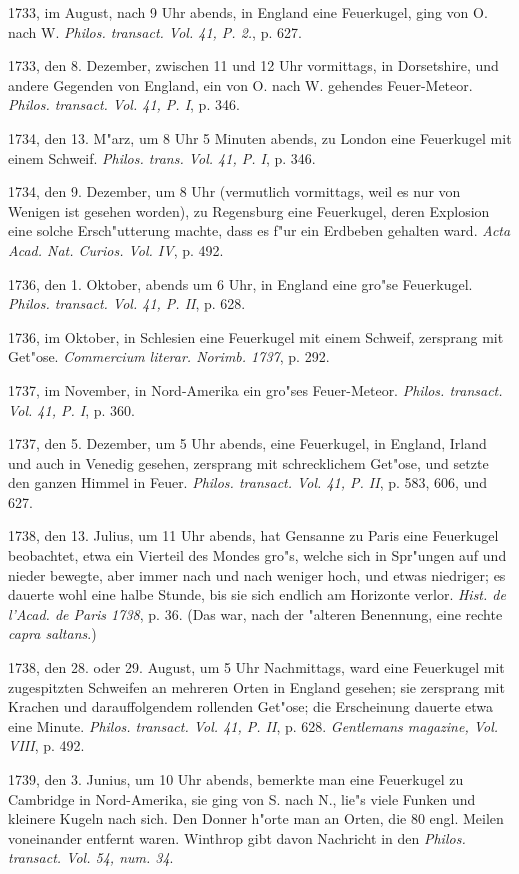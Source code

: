 \documentclass[a4paper, 11pt, oneside, polutonikogreek, german]{article}
\begin{document}
1733, im August, nach 9 Uhr abends, in England eine Feuerkugel, ging von O. nach W. \emph{Philos. transact. Vol. 41, P. 2.}, p. 627.

1733, den 8. Dezember, zwischen 11 und 12 Uhr vormittags, in Dorsetshire, und andere Gegenden von England, ein von O. nach W. gehendes Feuer-Meteor. \emph{Philos. transact. Vol. 41, P. I}, p. 346.

1734, den 13. M"arz, um 8 Uhr 5 Minuten abends, zu London eine Feuerkugel mit einem Schweif. \emph{Philos. trans. Vol. 41, P. I}, p. 346.

1734, den 9. Dezember, um 8 Uhr (vermutlich vormittags, weil es nur von Wenigen ist gesehen worden), zu Regensburg eine Feuerkugel, deren Explosion eine solche Ersch"utterung machte, dass es f"ur ein Erdbeben gehalten ward. \emph{Acta Acad. Nat. Curios. Vol. IV}, p. 492.

1736, den 1. Oktober, abends um 6 Uhr, in England eine gro"se Feuerkugel. \emph{Philos. transact. Vol. 41, P. II}, p. 628.

1736, im Oktober, in Schlesien eine Feuerkugel mit einem Schweif, zersprang mit Get"ose. \emph{Commercium literar. Norimb. 1737}, p. 292.

1737, im November, in Nord-Amerika ein gro"ses Feuer-Meteor. \emph{Philos. transact. Vol. 41, P. I}, p. 360.

1737, den 5. Dezember, um 5 Uhr abends, eine Feuerkugel, in England, Irland und auch in Venedig gesehen, zersprang mit schrecklichem Get"ose, und setzte den ganzen Himmel in Feuer. \emph{Philos. transact. Vol. 41, P. II}, p. 583, 606, und 627.

1738, den 13. Julius, um 11 Uhr abends, hat Gensanne zu Paris eine Feuerkugel beobachtet, etwa ein Vierteil des Mondes gro"s, welche sich in Spr"ungen auf und nieder bewegte, aber immer nach und nach weniger hoch, und etwas niedriger; es dauerte wohl eine halbe Stunde, bis sie sich endlich am Horizonte verlor. \emph{Hist. de l'Acad. de Paris 1738}, p. 36. (Das war, nach der "alteren Benennung, eine rechte \emph{capra saltans}.)

1738, den 28. oder 29. August, um 5 Uhr Nachmittags, ward eine Feuerkugel mit zugespitzten Schweifen an mehreren Orten in England gesehen; sie zersprang mit Krachen und darauffolgendem rollenden Get"ose; die Erscheinung dauerte etwa eine Minute. \emph{Philos. transact. Vol. 41, P. II}, p. 628. \emph{Gentlemans magazine, Vol. VIII}, p. 492.

1739, den 3. Junius, um 10 Uhr abends, bemerkte man eine Feuerkugel zu Cambridge in Nord-Amerika, sie ging von S. nach N., lie"s viele Funken und kleinere Kugeln nach sich. Den Donner h"orte man an Orten, die 80 engl. Meilen voneinander entfernt waren. Winthrop gibt davon Nachricht in den \emph{Philos. transact. Vol. 54, num. 34}.
\end{document}
